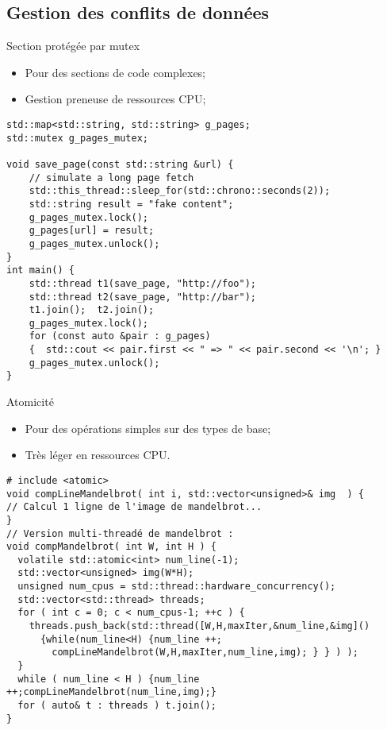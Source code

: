 \documentclass[handout,francais]{beamer}
\begin{document}
\subsection{Gestion des conflits de données}

\begin{frame}[fragile]{Section protégée par mutex}

{\scriptsize
\begin{itemize}
 \item Pour des sections de code complexes;
 \item Gestion preneuse de ressources CPU;
\end{itemize}
}

\begin{lstlisting}
std::map<std::string, std::string> g_pages;
std::mutex g_pages_mutex;
 
void save_page(const std::string &url) {
    // simulate a long page fetch
    std::this_thread::sleep_for(std::chrono::seconds(2));
    std::string result = "fake content";
    g_pages_mutex.lock();
    g_pages[url] = result;
    g_pages_mutex.unlock();
}
int main() {
    std::thread t1(save_page, "http://foo");
    std::thread t2(save_page, "http://bar");
    t1.join();  t2.join(); 
    g_pages_mutex.lock();
    for (const auto &pair : g_pages) 
    {  std::cout << pair.first << " => " << pair.second << '\n'; }
    g_pages_mutex.unlock();
}
\end{lstlisting}

\end{frame}

\begin{frame}[fragile]{Atomicité}

\begin{itemize}
 \item Pour des opérations simples sur des types de base;
 \item Très léger en ressources CPU.
\end{itemize}

\begin{lstlisting}
# include <atomic>
void compLineMandelbrot( int i, std::vector<unsigned>& img  ) {
// Calcul 1 ligne de l'image de mandelbrot...
}
// Version multi-threadé de mandelbrot :
void compMandelbrot( int W, int H ) {
  volatile std::atomic<int> num_line(-1);
  std::vector<unsigned> img(W*H);
  unsigned num_cpus = std::thread::hardware_concurrency();
  std::vector<std::thread> threads;
  for ( int c = 0; c < num_cpus-1; ++c ) {
    threads.push_back(std::thread([W,H,maxIter,&num_line,&img]()
      {while(num_line<H) {num_line ++;
        compLineMandelbrot(W,H,maxIter,num_line,img); } } ) );
  }
  while ( num_line < H ) {num_line ++;compLineMandelbrot(num_line,img);}
  for ( auto& t : threads ) t.join();
}
\end{lstlisting}

\end{frame}
\end{document}
